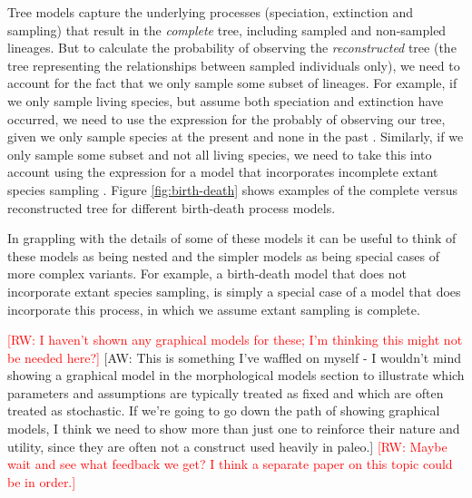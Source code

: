 \documentclass[11pt]{article}
\newcommand{\rw}[1]{{\textcolor{red}{[RW: #1]}}} %
\newcommand{\aw}[1]{{\textcolor{armygreen}{[AW: #1]}}} %
\begin{document}
Tree models capture the underlying processes (speciation, extinction and sampling) that result in the \textit{complete} tree, including sampled and non-sampled lineages. But to calculate the probability of observing the  \textit{reconstructed} tree (the tree representing the relationships between sampled individuals only), we need to account for the fact that we only sample some subset of lineages.
For example, if we only sample living species, but assume both speciation and extinction have occurred, we need to use the expression for the probably of observing our tree, given we only sample species at the present and none in the past \cite{Thompson1975,Gernhard2008, Stadler2009}.  Similarly, if we only sample some subset and not all living species, we need to take this into account using the expression for a model that incorporates incomplete extant species sampling \cite{Yang1997,Stadler2009}.
Figure \ref{fig:birth-death} shows examples of the complete versus reconstructed tree for different birth-death process models.

In grappling with the details of some of these models it can be useful to think of these models as being nested and the simpler models as being special cases of more complex variants.
For example, a birth-death model that does not incorporate extant species sampling, is simply a special case of a model that does incorporate this process, in which we assume extant sampling is complete. 

\rw{I haven't shown any graphical models for these; I'm thinking this might not be needed here?} \aw{This is something I've waffled on myself - I wouldn't mind showing a graphical model in the morphological models section to illustrate which parameters and assumptions are typically treated as fixed and which are often treated as stochastic. If we're going to go down the path of showing graphical models, I think we need to show more than just one to reinforce their nature and utility, since they are often not a construct used heavily in paleo.}
\rw{Maybe wait and see what feedback we get? I think a separate paper on this topic could be in order.}
\end{document}
